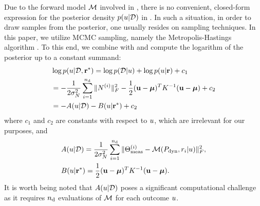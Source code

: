 Due to the forward model $\model$ involved in , there is no convenient, closed-form expression for the posterior density $\f{\u | \data}$ in . In such a situation, in order to draw samples from the posterior, one usually resides on sampling techniques. In this paper, we utilize MCMC sampling, namely the Metropolis-Hastings algorithm \cite{gelman2004}. To this end, we combine  with  and compute the logarithm of the posterior up to a constant summand:
\begin{align*}
  & \log \f{\u | \data, \vr^*} = \log \f{\data | \u} + \log \f{\u | \vr} + c_1 \\
  & = -\frac{1}{2 \sigma^2_\noise} \sum_{i = 1}^\ndata \fnorm{\mnoise^{(i)}}^2 -\frac{1}{2} (\vu - \vfMean)^T \mCov^{-1} (\vu - \vfMean) + c_2 \\
  & = - A(\u | \data) - B(\u | \vr^*) + c_2
\end{align*}
where $c_1$ and $c_2$ are constants with respect to $u$, which are irrelevant for our purposes, and
\begin{align*}
  & A(\u | \data ) = \frac{1}{2 \sigma^2_\noise} \sum_{i = 1}^\ndata \fnorm{\mT^{(i)}_{\meas} - \model{\mP_\dyn, \r_i | \u}}^2, \\
  & B(\u | \vr^*) = \frac{1}{2} (\vu - \vfMean)^T \mCov^{-1} (\vu - \vfMean).
\end{align*}
It is worth being noted that $A(u | \mathcal{D})$ poses a significant computational challenge as it requires ${n_\text{d}}$ evaluations of $\model$ for each outcome $u$.
